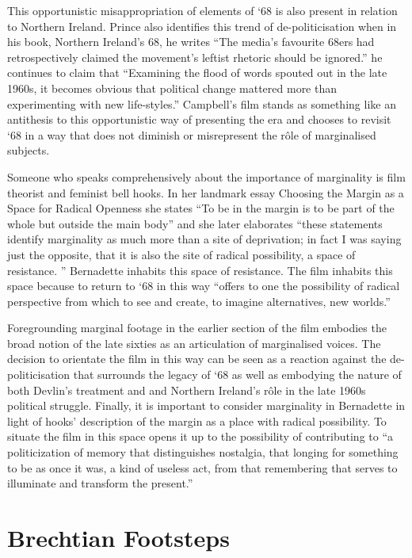\documentclass[12pt]{article}
\begin{document}
This opportunistic misappropriation of elements of `68 is also present in relation to Northern Ireland. Prince also identifies this trend of de-politicisation when in his book, Northern Ireland's 68, he writes ``The media's favourite 68ers had retrospectively claimed the movement's leftist rhetoric should be ignored.'' he continues to claim that ``Examining the flood of words spouted out in the late 1960s, it becomes obvious that political change mattered more than experimenting with new life-styles.''\cite[pp~7]{Prince:2007aa} Campbell's film stands as something like an antithesis to this opportunistic way of presenting the era and chooses to revisit `68 in a way that does not diminish or misrepresent the r\^{o}le of marginalised subjects. 

Someone who speaks comprehensively about the importance of marginality is film theorist and feminist bell hooks. In her landmark essay Choosing the Margin as a Space for Radical Openness \citeyear{Hooks:1989aa} she states ``To be in the margin is to be part of the whole but outside the main body'' and she later elaborates ``these statements identify marginality as much more than a site of deprivation; in fact I was saying just the opposite, that it is also the site of radical possibility, a space of resistance. '' Bernadette inhabits this space of resistance. The film inhabits this space because to return to `68 in this way ``offers to one the possibility of radical perspective from which to see and create, to imagine alternatives, new worlds.''\cite{Hooks:1989aa}

Foregrounding marginal footage in the earlier section of the film embodies the broad notion of the late sixties as an articulation of marginalised voices. The decision to orientate the film in this way can be seen as a reaction against the de-politicisation that surrounds the legacy of `68 as well as embodying the nature of both Devlin's treatment and and Northern Ireland's r\^{o}le in the late 1960s political struggle. Finally, it is important to consider marginality in Bernadette in light of hooks' description of the margin as a place with radical possibility. To situate the film in this space opens it up to the possibility of contributing to ``a politicization of memory that distinguishes nostalgia, that longing for something to be as once it was, a kind of useless act, from that remembering that serves to illuminate and transform the present.''\cite{Hooks:1989aa}

\section{Brechtian Footsteps}
\end{document}
